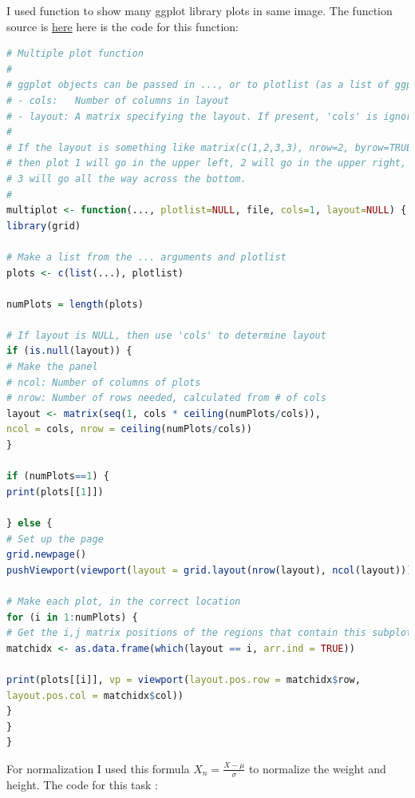 \documentclass{article}
\begin{document}
	I used function to show many ggplot library plots in same image. The function source is \href{http://www.cookbook-r.com/Graphs/Multiple_graphs_on_one_page_%28ggplot2%29/}{here} 
		here is the code for this function:
	\begin{lstlisting}[language=R]
# Multiple plot function
#
# ggplot objects can be passed in ..., or to plotlist (as a list of ggplot objects)
# - cols:   Number of columns in layout
# - layout: A matrix specifying the layout. If present, 'cols' is ignored.
#
# If the layout is something like matrix(c(1,2,3,3), nrow=2, byrow=TRUE),
# then plot 1 will go in the upper left, 2 will go in the upper right, and
# 3 will go all the way across the bottom.
#
multiplot <- function(..., plotlist=NULL, file, cols=1, layout=NULL) {
library(grid)

# Make a list from the ... arguments and plotlist
plots <- c(list(...), plotlist)

numPlots = length(plots)

# If layout is NULL, then use 'cols' to determine layout
if (is.null(layout)) {
# Make the panel
# ncol: Number of columns of plots
# nrow: Number of rows needed, calculated from # of cols
layout <- matrix(seq(1, cols * ceiling(numPlots/cols)),
ncol = cols, nrow = ceiling(numPlots/cols))
}

if (numPlots==1) {
print(plots[[1]])

} else {
# Set up the page
grid.newpage()
pushViewport(viewport(layout = grid.layout(nrow(layout), ncol(layout))))

# Make each plot, in the correct location
for (i in 1:numPlots) {
# Get the i,j matrix positions of the regions that contain this subplot
matchidx <- as.data.frame(which(layout == i, arr.ind = TRUE))

print(plots[[i]], vp = viewport(layout.pos.row = matchidx$row,
layout.pos.col = matchidx$col))
}
}
}
	\end{lstlisting}
For normalization I used this formula \(X_n = \frac{X-\mu}{\sigma}\) to normalize the weight and height.
	The code for this task : 
\end{document}
